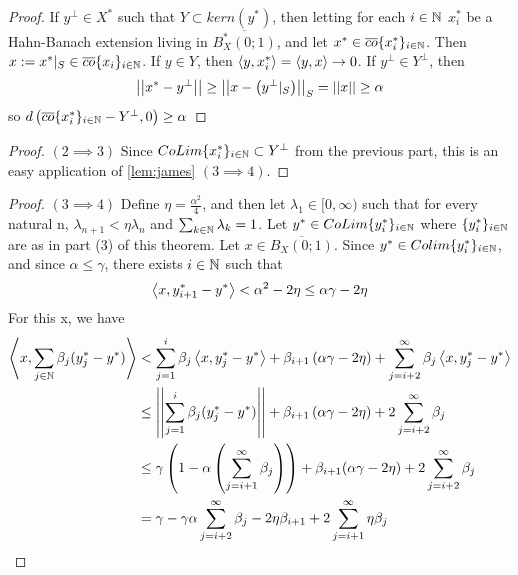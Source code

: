 \begin{thm}[James]
\begin{proof}
        If $y^{\perp} \in X^*$ such that $Y \subset kern(y^*)$, then letting for each $i \in \mathbb{N}$ $x_i^*$ be a Hahn-Banach extension living in $\overline{B_X^*(0;1)}$, and let $x^* \in \overline{co}\{x_i^*\}_{i \in \mathbb{N}}$. Then $x:=x^*|_{S} \in \overline{co}\{x_i\}_{i \in \mathbb{N}}$. If $y \in Y$, then 
        $\left\langle y,x_i^* \right\rangle=\left\langle y,x \right\rangle \to 0$.
        If $y^{\perp} \in Y^{\perp}$, then 
        \begin{equation}
            \left|\left| x^*-y^{\perp} \right|\right| \geq \left|\left| x-\left( y^{\perp}|_S\right) \right|\right|_S = \left|\left| x \right|\right| \geq \alpha
        \end{equation}
        so $d\left(  \overline{co}\{x_i^*\}_{i \in \mathbb{N}}-Y^{\perp},0\right) \geq \alpha$
    \end{proof}
    \begin{proof} $(2 \implies 3)$
        Since $CoLim\{x_i^*\}_{i \in \mathbb{N}} \subset Y^{\perp}$ from the previous part, this is an easy application of \ref{lem:james} $(3 \implies 4)$. 
    \end{proof}
    \begin{proof} $(3 \implies 4)$
        Define $\eta=\frac{\alpha^2}{4}$, and then let $\lambda_1 \in [0,\infty)$ such that for every natural n, $\lambda_{n+1} <\eta \lambda_n$ and $\sum_{k \in \mathbb{N}} \lambda_k = 1$.
        Let $y^* \in CoLim\{y_i^*\}_{i \in \mathbb{N}}$ where $\{y_i^*\}_{i \in \mathbb{N}}$ are as in part (3) of this theorem. Let $x \in \overline{B_X(0;1)}$. Since $y^* \in Colim\{y_i^*\}_{i \in \mathbb{N}}$, and since $\alpha \leq \gamma$, there exists $i \in \mathbb{N}$ such that 
        \begin{equation}
            \left\langle x,y_{i+1}^*-y^* \right\rangle < \alpha^2 - 2\eta \leq \alpha \gamma - 2 \eta
        \end{equation}
        For this x, we have 
        \begin{equation}
            \begin{split}
                \ip{x, \sum_{j \in \N} \beta_j (y_j^*-y^*)}& < \sum_{j=1}^i \beta_j \ip{x,y_j^*-y^*}+ \beta_{i+1} \pa{\alpha \gamma - 2 \eta} + \sum_{j=i+2}^{\infty} \beta_j \ip{x,y_j^*-y^*}\\
                & \leq \norm{\sum_{j=1}^i \beta_j(y_j^*-y^*)}+ \beta_{i+1} \pa{\alpha \gamma -2\eta}+ 2 \sum_{j=i+2}^{\infty} \beta_j\\
                & \leq \gamma \pa{1-\alpha \pa{\sum_{j=i+1}^{\infty} \beta_j}}+ \beta_{i+1}(\alpha \gamma -2\eta)+ 2 \sum_{j=i+2}^{\infty} \beta_j\\
                & = \gamma -\gamma \alpha \sum_{j=i+2}^{\infty} \beta_j-2 \eta \beta_{i+1} + 2 \sum_{j=i+1}^{\infty} \eta \beta_j\\

\end{split}
\end{equation}
\end{proof}
\end{thm}

